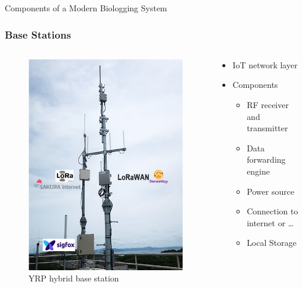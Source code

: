 \documentclass{beamer}
\begin{document}
  \begin{frame}{Components of a Modern Biologging System}
    \frametitle{Base Stations}
    \begin{columns}
      \begin{column}{0.4\textwidth}
        \begin{figure}[htbp]
          \centering
          \includegraphics[height=.7\textheight]{images/BaseStation.jpg}
          \caption{YRP hybrid base station \cite{miyajima_2020}}
          \label{fig:LPWAN_Base_Station}
        \end{figure}
      \end{column}
      \begin{column}{0.6\textwidth}
        \begin{itemize}
          \item IoT network layer
          \item Components
          \begin{itemize}
            \item RF receiver and transmitter
            \item Data forwarding engine
            \item Power source
            \item Connection to internet or \ldots
            \item Local Storage
          \end{itemize}
        \end{itemize}
      \end{column}
    \end{columns}
  \end{frame}
\end{document}
